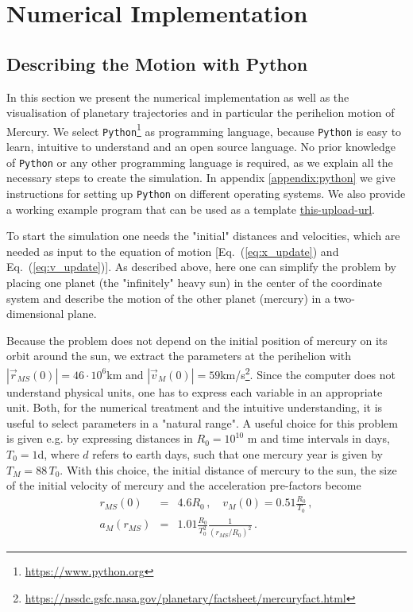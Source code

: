 \documentclass[12pt, UK english]{iopart}
\newcommand{\python}[0]{\texttt{Python}}
\newcommand{\abs}[1]{\left\vert #1 \right\vert}
\begin{document}
\section{Numerical Implementation}\label{sec:Numerical Implementation}

\subsection{Describing the Motion with Python}

In this section we present the numerical implementation as well as the visualisation of planetary trajectories and in
particular
the perihelion motion of Mercury.  We select \python{}\footnote{\url{https://www.python.org}} as  programming language, because \python{} is easy to learn, intuitive to understand and an open source language.
No prior knowledge of \python{} or any other programming language is required, as we explain all the necessary steps to create the simulation.
In appendix \ref{appendix:python} we give instructions for setting up \python{} on different operating systems.
We also provide a working example program that can be used as a template \url{this-upload-url}.

To start the simulation one needs the "initial" distances and velocities, which are needed as input to the equation of motion [Eq.~(\ref{eq:x_update}) and Eq.~(\ref{eq:v_update})].
As described above, here  one can simplify the problem by placing one planet (the "infinitely" heavy sun) in the center of the coordinate system and describe the motion of the other planet (mercury) in a two-dimensional plane.  

Because the problem does not depend on the initial position of mercury on its orbit around the sun, we extract the parameters at the perihelion with $ \abs{\vec r_{MS}(0)} = 46 \cdot 10^6$km and $ \abs{\vec v_M(0)} = 59$km/s\footnote{\url{https://nssdc.gsfc.nasa.gov/planetary/factsheet/mercuryfact.html}}.
Since the computer does not understand physical units, one has to express each variable in an appropriate unit.
Both, for the numerical treatment and the intuitive understanding, it is useful to select parameters in a "natural range".
A useful choice for this problem is given e.g. by expressing distances in $R_0 = 10^{10}$ m and time intervals in days, $T_0 = 1$d, where $d$ refers to earth days, such that one mercury year is given by $T_M=88\,T_0$.
With this choice, the initial distance of mercury to the sun, the size of the initial velocity of mercury and the acceleration pre-factors become
\begin{eqnarray}
r_{MS}(0)   &=& 4.6 R_0 \, , \quad
v_{M}(0)    = 0.51 \frac{R_0}{T_0} \, ,  \\
a_M(r_{MS}) &=& 1.01 \frac{R_0}{T_0^2} \frac{1}{\left(r_{MS}/R_0\right)^2} 
\, .
\end{eqnarray}
\end{document}

